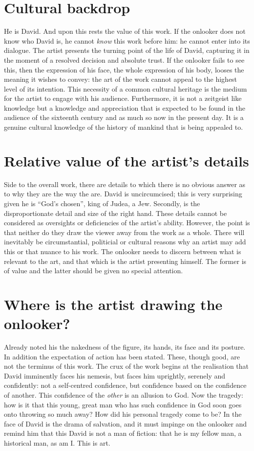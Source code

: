 \documentclass[a4paper,10pt]{article}
\begin{document}
\section*{Cultural backdrop}
He is David. And upon this rests the value of this work. If the onlooker does not know who David is, he cannot \emph{know} this work before him: he cannot enter into its dialogue. The artist presents the turning point of the life of David, capturing it in the moment of a resolved decision and absolute trust. If the onlooker fails to see this, then the expression of his face, the whole expression of his body, looses the meaning it wishes to convey: the art of the work cannot appeal to the highest level of its intention. This necessity of a common cultural heritage is the medium for the artist to engage with his audience. Furthermore, it is not a zeitgeist like knowledge but a knowledge and appreciation that is expected to be found in the audience of the sixteenth century and as much so now in the present day. It is a genuine cultural knowledge of the history of mankind that is being appealed to.

\section*{Relative value of the artist's details}
Side to the overall work, there are details to which there is no obvious answer as to why they are the way the are. David is uncircumcised; this is very surprising given he is ``God's chosen'', king of Judea, a Jew. Secondly, is the disproportionate detail and size of the right hand. These details cannot be considered as oversights or deficiencies of the artist's ability. However, the point is that neither do they draw the viewer away from the work as a whole. There will inevitably be circumstantial, politicial or cultural reasons why an artist may add this or that nuance to his work. The onlooker needs to discern between what is relevant to the art, and that which is the artist presenting himself. The former is of value and the latter should be given no special attention.

\section*{Where is the artist drawing the onlooker?}
Already noted his the nakedness of the figure, its hands, its face and its posture. In addition the expectation of action has been stated. These, though good, are not the terminus of this work. The crux of the work begins at the realisation that David imminently faces his nemesis, but faces him uprightly, serenely and confidently: not a self-centred confidence, but confidence based on the confidence of another. This confidence of the \emph{other} is an allusion to God. Now the tragedy: how is it that this young, great man who has such confidence in God soon goes onto throwing so much away? How did his personal tragedy come to be? In the face of David is the drama of salvation, and it must impinge on the onlooker and remind him that this David is not a man of fiction: that he is my fellow man, a historical man, as am I. This is art.
\end{document}
